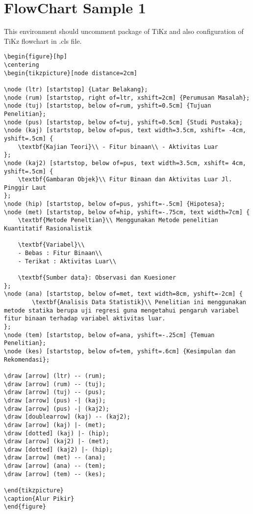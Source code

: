\documentclass[12pt]{article}
\begin{document}
\section{FlowChart Sample 1}
This environment should uncomment package of TiKz and also configuration of TiKz flowchart in .cls file.
\begin{lstlisting}
\begin{figure}[hp]
\centering
\begin{tikzpicture}[node distance=2cm]

\node (ltr) [startstop] {Latar Belakang};
\node (rum) [startstop, right of=ltr, xshift=2cm] {Perumusan Masalah};
\node (tuj) [startstop, below of=rum, yshift=0.5cm] {Tujuan Penelitian};
\node (pus) [startstop, below of=tuj, yshift=0.5cm] {Studi Pustaka};
\node (kaj) [startstop, below of=pus, text width=3.5cm, xshift= -4cm, yshift=.5cm] {
	\textbf{Kajian Teori}\\ - Fitur binaan\\ - Aktivitas Luar
};
\node (kaj2) [startstop, below of=pus, text width=3.5cm, xshift= 4cm, yshift=.5cm] {
	\textbf{Gambaran Objek}\\ Fitur Binaan dan Aktivitas Luar Jl. Pinggir Laut
};
\node (hip) [startstop, below of=pus, yshift=-.5cm] {Hipotesa};
\node (met) [startstop, below of=hip, yshift=-.75cm, text width=7cm] {
	\textbf{Metode Peneltian}\\ Menggunakan Metode penelitian Kuantitatif Rasionalistik

	\textbf{Variabel}\\
	- Bebas : Fitur Binaan\\
	- Terikat : Aktivitas Luar\\

	\textbf{Sumber data}: Observasi dan Kuesioner
};
\node (ana) [startstop, below of=met, text width=8cm, yshift=-2cm] {
		\textbf{Analisis Data Statistik}\\ Penelitian ini menggunakan metode statika berupa uji regresi guna mengetahui pengaruh variabel fitur binaan terhadap variabel aktivitas luar.
};
\node (tem) [startstop, below of=ana, yshift=-.25cm] {Temuan Penelitian};
\node (kes) [startstop, below of=tem, yshift=.6cm] {Kesimpulan dan Rekomendasi};

\draw [arrow] (ltr) -- (rum);
\draw [arrow] (rum) -- (tuj);
\draw [arrow] (tuj) -- (pus);
\draw [arrow] (pus) -| (kaj);
\draw [arrow] (pus) -| (kaj2);
\draw [doublearrow] (kaj) -- (kaj2);
\draw [arrow] (kaj) |- (met);
\draw [dotted] (kaj) |- (hip);
\draw [arrow] (kaj2) |- (met);
\draw [dotted] (kaj2) |- (hip);
\draw [arrow] (met) -- (ana);
\draw [arrow] (ana) -- (tem);
\draw [arrow] (tem) -- (kes);

\end{tikzpicture}
\caption{Alur Pikir}
\end{figure}
\end{lstlisting}
\end{document}
